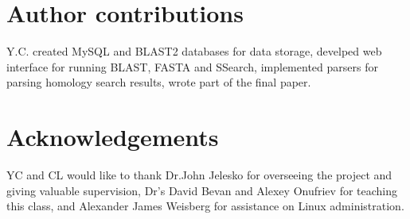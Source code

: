 \documentclass[11pt,letterpaper,twoside,english]{article}
\begin{document}
\section{Author contributions}

Y.C. created MySQL and BLAST2 databases for data storage, develped
web interface for running BLAST, FASTA and SSearch, implemented parsers
for parsing homology search results, wrote part of the final paper.


\section{Acknowledgements}

YC and CL would like to thank Dr.John Jelesko for overseeing the project
and giving valuable supervision, Dr's David Bevan and Alexey Onufriev
for teaching this class, and Alexander James Weisberg for assistance
on Linux administration.



\end{document}
